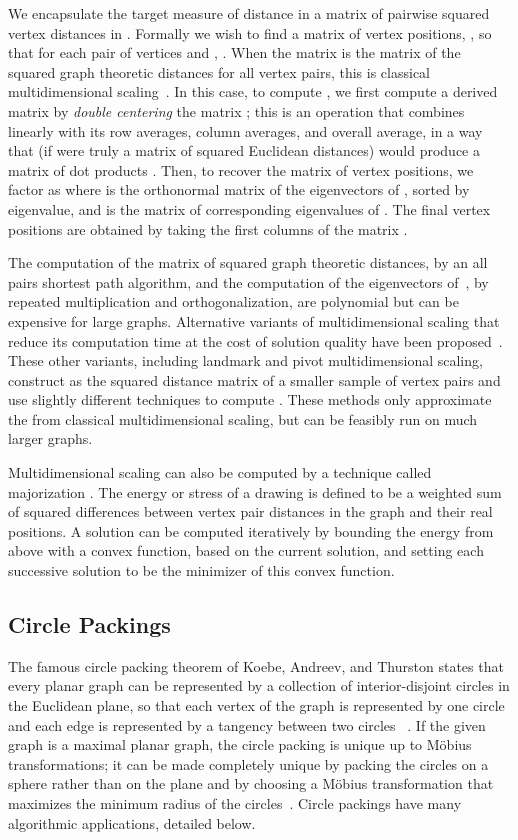 \documentclass[oribibl,10pt]{llncs}
\begin{document}
\begin{appendix}
We encapsulate the target measure of distance in a matrix  of pairwise squared vertex distances in .  Formally we wish to find a matrix of vertex positions, , so that for each pair of vertices  and , .  When the matrix  is the matrix of the squared graph theoretic distances for all vertex pairs, this is classical multidimensional scaling~.  In this case, to compute , we first compute a derived matrix  by \emph{double centering} the matrix ; this is an operation that combines  linearly with its row averages, column averages, and overall average, in a way that (if  were truly a matrix of squared Euclidean distances) would produce a matrix of dot products  . Then, to recover the matrix  of vertex positions, we factor  as  where  is the orthonormal matrix of the eigenvectors of , sorted by eigenvalue, and  is the matrix of corresponding eigenvalues of .  The final vertex positions are obtained by taking the first  columns of the matrix .

The computation of the matrix  of squared graph theoretic distances, by an all pairs shortest path algorithm, and the computation of the eigenvectors of~, by repeated multiplication and orthogonalization, are polynomial but can be expensive for large graphs.  Alternative variants of multidimensional scaling that reduce its computation time at the cost of solution quality have been proposed~.  These other variants, including landmark and pivot multidimensional scaling, construct  as the squared distance matrix of a smaller sample of vertex pairs and use slightly different techniques to compute . These methods only approximate the  from classical multidimensional scaling, but can be feasibly run on much larger graphs.

Multidimensional scaling can also be computed by a technique called majorization .  The energy or stress of a drawing is defined to be a weighted sum of squared differences between vertex pair distances in the graph and their real positions.  A solution can be computed iteratively by bounding the energy from above with a convex function, based on the current solution, and setting each successive solution to be the minimizer of this convex function.

\subsection{Circle Packings}
The famous circle packing theorem of Koebe, Andreev, and Thurston states that every planar graph can be represented by a collection of interior-disjoint circles in the Euclidean plane, so that each vertex of the graph is represented by one circle and each edge is represented by a tangency between two circles~\cite{Koe-BSAWL-36} . If the given graph is a maximal planar graph, the circle packing is unique up to M\"obius transformations; it can be made completely unique by packing the circles on a sphere rather than on the plane and by choosing a M\"obius transformation that maximizes the minimum radius of the circles~.
Circle packings have many algorithmic applications, detailed below.


\end{appendix}
\end{document}
